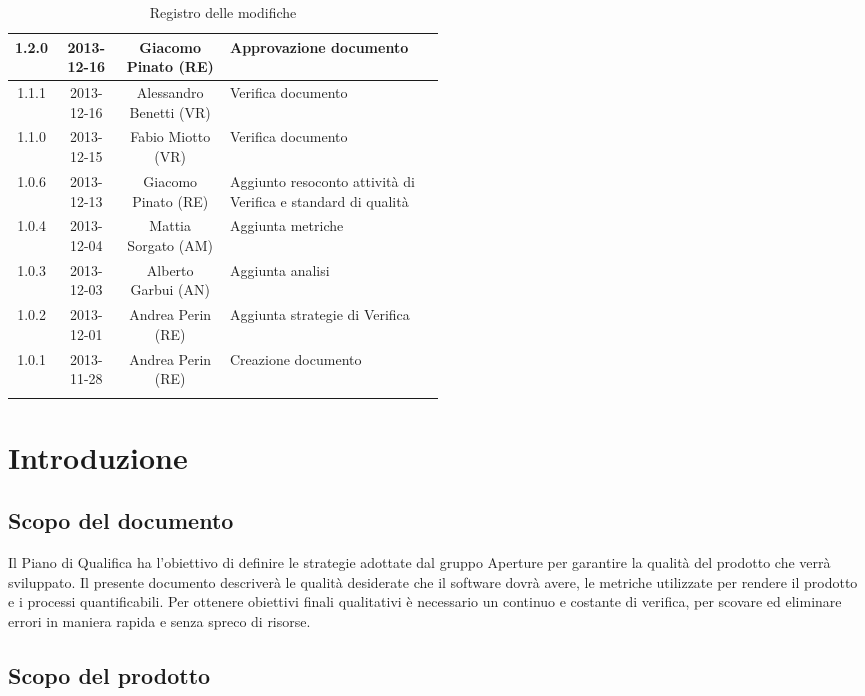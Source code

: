 \begin{center}
\begin{longtable}{|c|c|c|p{0.5\linewidth}|}
\midrule
1.2.0 & 2013-12-16 & Giacomo Pinato (RE) & Approvazione documento\\
\midrule
1.1.1 & 2013-12-16 & Alessandro Benetti (VR) & Verifica documento\\
\midrule
1.1.0 & 2013-12-15 & Fabio Miotto (VR) & Verifica documento\\
\midrule
1.0.6 & 2013-12-13 & Giacomo Pinato (RE) & Aggiunto resoconto attività di Verifica e standard di qualità\\
\midrule
1.0.4 & 2013-12-04 & Mattia Sorgato (AM) & Aggiunta metriche\\
\midrule
1.0.3 & 2013-12-03 & Alberto Garbui (AN) & Aggiunta analisi\\
\midrule
1.0.2 & 2013-12-01 & Andrea Perin (RE) & Aggiunta strategie di Verifica\\
\midrule
1.0.1 & 2013-11-28 & Andrea Perin (RE) & Creazione documento\\

\bottomrule
\caption{Registro delle modifiche}
\label{tab:changelog}
\end{longtable}
\end{center}

\newpage
\tableofcontents

\newpage
\listoftables
\listoffigures

\newpage
\section{Introduzione}%
\label{1.0}
\subsection{Scopo del documento}%
\label{1.1}
Il Piano di Qualifica ha l'obiettivo di definire le strategie adottate dal gruppo Aperture  per garantire la qualità del prodotto che verrà sviluppato.
Il presente documento descriverà le qualità desiderate che il software dovrà avere, le metriche utilizzate per rendere il prodotto e i processi quantificabili. Per ottenere obiettivi finali qualitativi è necessario un continuo e costante  di verifica, per scovare ed eliminare errori in maniera rapida e senza spreco di risorse.

\subsection{Scopo del prodotto}%
\label{1.2}
\Prodotto{}

